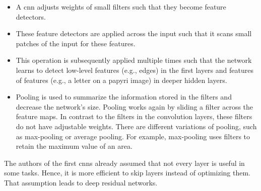 \begin{itemize}
	\item A \ac{cnn} adjusts weights of small filters such that they become feature detectors.
	\item These feature detectors are applied across the input such that it scans small patches of the input for these features. 
	\item This operation is subsequently applied multiple times such that the network learns to detect low-level features (e.g., edges) in the first layers and features of features (e.g., a letter on a papyri image) in deeper hidden layers.
	\item Pooling is used to summarize the information stored in the filters and decrease the network's size. Pooling works again by sliding a filter across the feature maps. In contrast to the filters in the convolution layers, these filters do not have adjustable weights. There are different variations of pooling, such as max-pooling or average pooling. For example, max-pooling uses filters to retain the maximum value of an area. 
\end{itemize}
The authors of the first \acp{cnn} already assumed that not every layer is useful in some tasks. Hence, it is more efficient to skip layers instead of optimizing them. That assumption leads to deep residual networks. 
%
